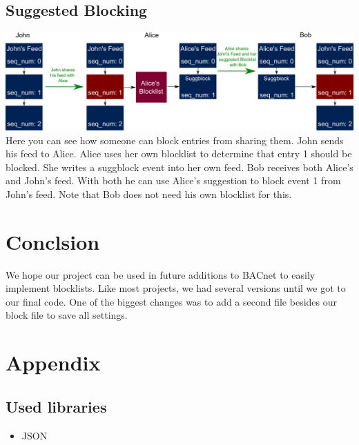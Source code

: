 \documentclass{article}
\begin{document}
\subsection{Suggested Blocking}
\includegraphics[width=\textwidth]{graph1}
Here you can see how someone can block entries from sharing them.
John sends his feed to Alice. Alice uses her own blocklist to determine that entry 1 should be blocked.
She writes a suggblock event into her own feed. Bob receives both Alice's and John's feed. 
With both he can use Alice's suggestion to block event 1 from John's feed.
Note that Bob does not need his own blocklist for this.






\section{Conclsion}
We hope our project can be used in future additions to BACnet to easily implement blocklists.
Like most projects, we had several versions until we got to our final code.
One of the biggest changes was to add a second file besides our block file to save all settings.


\section{Appendix}
\subsection{Used libraries}
\begin{itemize}
  \item JSON
\end{itemize}
\end{document}
